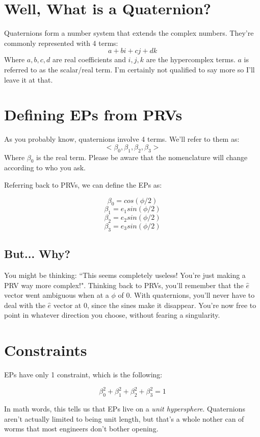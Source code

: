 \documentclass[a4paper,14pt]{extreport}
\begin{document}
\section{Well, What is a Quaternion?}
Quaternions form a number system that extends the complex numbers. They're commonly represented with 4 terms:
\[
a + bi + cj + dk
\]
Where \(a,b,c,d\) are real coefficients and \(i,j,k\) are the hypercomplex terms. \(a\) is referred to as the scalar/real term. I'm certainly not qualified to say more so I'll leave it at that.

\section{Defining EPs from PRVs}
As you probably know, quaternions involve 4 terms. We'll refer to them as:
\[<\beta_0,\beta_1,\beta_2,\beta_3>\]
Where $\beta_0$ is the real term. Please be aware that the nomenclature will change according to who you ask.

Referring back to PRVs, we can define the EPs as:

\[\beta_0 = cos(\phi/2)\]
\[\beta_1 = e_1 sin(\phi/2)\]
\[\beta_2 = e_2 sin(\phi/2)\]
\[\beta_3 = e_3 sin(\phi/2)\]

\subsection{But... Why?}
You might be thinking: ``This seems completely useless! You're just making a PRV way more complex!". Thinking back to PRVs, you'll remember that the \(\hat{e}\) vector went ambiguous when at a \(\phi\) of 0. With quaternions, you'll never have to deal with the \(\hat{e}\) vector at 0, since the sines make it disappear. You're now free to point in whatever direction you choose, without fearing a singularity.

\section{Constraints}
EPs have only 1 constraint, which is the following:\

\[\beta_0^2+\beta_1^2+\beta_2^2+\beta_3^2=1\]

In math words, this tells us that EPs live on a \emph{unit hypersphere}. Quaternions aren't actually limited to being unit length, but that's a whole nother can of worms that most engineers don't bother opening.
\end{document}
